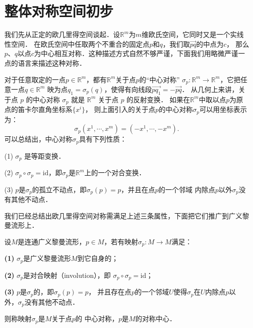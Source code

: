 
\section{整体对称空间初步}
我们先从正定的欧几里得空间谈起．设$\mathbb{R}^m$为$m$维欧氏空间，它同时又是一个实线性空间．
在欧氏空间中任取两个不重合的固定点$p$和$q$，我们取$\overrightarrow{pq}$的中点为$c$，
那么$p$、$q$以点$c$为中心相互对称．这种描述方式自然不够严谨，下面我们用略微严谨一点的语言来描述这种对称．

对于任意取定的一点$p \in \mathbb{R}^m$，都有$\mathbb{R}^m$关于点$p$的“中心对称”
$\sigma_p: \mathbb{R}^m \rightarrow \mathbb{R}^m$，它把任意一点$q \in \mathbb{R}^m$
映为点$q_1=\sigma_p(q)$，使得有向线段$\overrightarrow{p q_1}=-\overrightarrow{p q}$．
从几何上来讲，关于点 $p$ 的中心对称 $\sigma_p$ 就是 $\mathbb{R}^m$ 关于点 $p$ 的反射变换．
如果在$\mathbb{R}^m$中取以点$p$为原点的笛卡尔直角坐标系$\{x^i\}$，
则上面引入的关于点$p$的中心对称$\sigma_p$可以用坐标表示为：
\begin{equation*}
    \sigma_p\left(x^1, \cdots, x^m\right)=\left(-x^1, \cdots,-x^m\right) .
\end{equation*}
可以总结出，中心对称$\sigma_p$具有下列性质：

(1) $\sigma_p$ 是等距变换．

(2) $\sigma_p \circ \sigma_p=\mathrm{id}$，即$\sigma_p$是$\mathbb{R}^m$上的一个对合变换．

(3) $p$是$\sigma_p$的孤立不动点，即$\sigma_p(p)=p$，并且在点$p$的一个邻域
内除点$p$以外$\sigma_p$没有其他不动点．


我们已经总结出欧几里得空间对称需满足上述三条属性，下面把它们推广到广义黎曼流形上．

\begin{definition}\label{chhss:def_center-sym}
    设$M$是连通广义黎曼流形，$p \in M$，若有映射$\sigma_p: M \rightarrow M$满足：
    
    {\bfseries (1)} $\sigma_p$是广义黎曼流形$M$到它自身的；
    
    {\bfseries (2)} $\sigma_p$是{\heiti 对合}映射（involution），即 $\sigma_p \circ \sigma_p=\mathrm{id}$；
    
    {\bfseries (3)} $p$是$\sigma_p$的，即$\sigma_p(p)=p$，
    并且存在点$p$的一个邻域$U$使得$\sigma_p$在$U$内除点$p$以外，$\sigma_p$没有其他不动点．
    
    则称映射$\sigma_p$是$M$关于点$p$的 {\heiti 中心对称}，$p$是$M$的{\heiti 对称中心}．
\end{definition}

